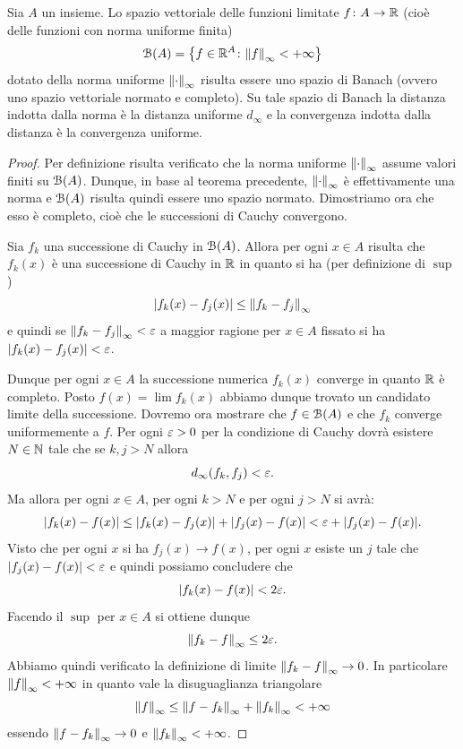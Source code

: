 \begin{theorem}%
  \label{th:limitate_completo}%
Sia $A$ un insieme.
Lo spazio vettoriale
delle funzioni limitate $f\colon A \to {\mathbb R}$
(cioè delle funzioni con norma uniforme finita)
\[
  \mathcal B(A) = {\left\{ f\in {\mathbb R}^A\colon {\left\Vert f\right\Vert}_\infty < +\infty  \right\}}
\]
dotato della norma uniforme ${\left\Vert \cdot\right\Vert}_\infty$ risulta essere uno spazio di Banach (ovvero uno spazio vettoriale normato e completo).
Su tale spazio di Banach la distanza indotta dalla norma è la distanza uniforme $d_\infty$ e la convergenza indotta dalla distanza è la convergenza uniforme.
\end{theorem}
%
\begin{proof}
Per definizione risulta verificato che la norma uniforme ${\left\Vert \cdot\right\Vert}_\infty$ assume valori finiti su $\mathcal B(A)$.
Dunque, in base al teorema precedente, ${\left\Vert \cdot\right\Vert}_\infty$ è effettivamente una norma e $\mathcal B(A)$ risulta quindi essere uno spazio normato. Dimostriamo ora che esso è completo, cioè che le successioni di Cauchy convergono.

Sia $f_k$ una successione di Cauchy in $\mathcal B(A)$.
Allora per ogni $x\in A$ risulta che $f_k(x)$ è una successione di Cauchy in ${\mathbb R}$ in quanto si ha (per definizione di $\sup$)
\[
  {\left|f_k(x) - f_j(x)\right|} \le {\left\Vert f_k - f_j\right\Vert}_\infty
\]
e quindi se ${\left\Vert f_k- f_j\right\Vert}_\infty < \varepsilon$
a maggior ragione per $x\in A$ fissato si ha ${\left|f_k(x)-f_j(x)\right|} < \varepsilon$.

Dunque per ogni $x\in A$ la successione numerica $f_k(x)$ converge in quanto ${\mathbb R}$ è completo. Posto $f(x) = \lim f_k(x)$ abbiamo dunque trovato un candidato limite della successione.
Dovremo ora mostrare che $f\in \mathcal B(A)$ e che $f_k$ converge uniformemente a $f$.
Per ogni $\varepsilon>0$ per la condizione di Cauchy dovrà esistere $N\in {\mathbb N}$ tale che se $k,j>N$ allora
\[
  d_\infty(f_k,f_j) < \varepsilon.
\]
Ma allora per ogni $x\in A$, per ogni $k>N$ e per ogni $j>N$ si avrà:
\[
  {\left|f_k(x) - f(x)\right|} \le {\left|f_k(x) - f_j(x)\right|} +
  {\left|f_j(x) - f(x)\right|} < \varepsilon + {\left|f_j(x)-f(x)\right|}.
\]
Visto che per ogni $x$ si ha $f_j(x) \to f(x)$, per ogni $x$ esiste un $j$ tale che ${\left|f_j(x)-f(x)\right|} < \varepsilon$ e quindi possiamo concludere che
\[
  {\left|f_k(x)-f(x)\right|} < 2\varepsilon.
\]
Facendo il $\sup$ per $x\in A$ si ottiene dunque
\[
  {\left\Vert f_k -f\right\Vert}_\infty \le 2 \varepsilon.
\]
Abbiamo quindi verificato la definizione di limite ${\left\Vert f_k -f\right\Vert}_\infty\to 0$. In particolare ${\left\Vert f\right\Vert}_\infty < +\infty$ in quanto vale la disuguaglianza triangolare
\[
  {\left\Vert f\right\Vert}_\infty \le {\left\Vert f-f_k\right\Vert}_\infty + {\left\Vert f_k\right\Vert}_\infty < +\infty
\]
essendo ${\left\Vert f-f_k\right\Vert}_\infty \to 0$ e ${\left\Vert f_k\right\Vert}_\infty < +\infty$.
\end{proof}

